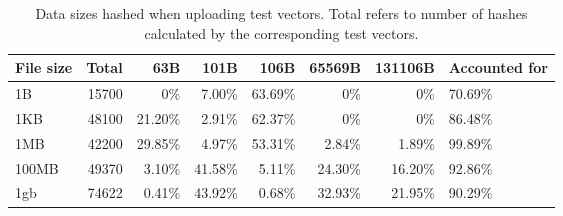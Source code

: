 \begin{table}
  \centering
  \begin{tabular}{ | p{1.3cm} | r | r | r | r | r | r | p{2cm}|}
    \hline
    \textbf{File size} & \textbf{Total} & \textbf{63B} &\textbf{101B} & \textbf{106B} & \textbf{65569B} & \textbf{131106B} & \textbf{Accounted for}\\ \hline
    1B     &         15700  &     0\%       &      7.00\%      &         63.69\%  &  0\%      &  0\%      & 70.69\% \\  \hline
    1KB    &         48100  &     21.20\%   &      2.91\%      &         62.37\%  &  0\%      &  0\%      & 86.48\% \\  \hline
    1MB    &         42200  &     29.85\%   &      4.97\%      &         53.31\%  &  2.84\%   &  1.89\%   & 99.89\% \\  \hline
    100MB  &         49370  &     3.10\%    &      41.58\%     &         5.11\%   &  24.30\%  &  16.20\%  & 92.86\% \\  \hline
    1gb    &         74622  &     0.41\%    &      43.92\%     &         0.68\%   &  32.93\%  &  21.95\%  & 90.29\% \\  \hline
\end{tabular}
  \caption{Data sizes hashed when uploading test vectors. Total refers to number of hashes calculated by the corresponding test vectors.}
  \label{tbl:tahoe:datauploaded}
\end{table}
